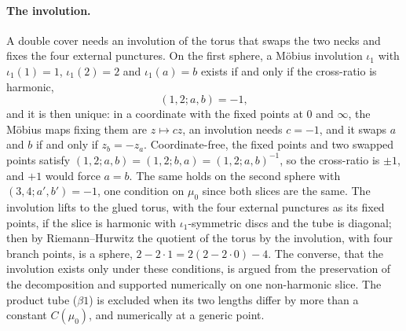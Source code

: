 \paragraph{The involution.}
A double cover needs an involution of the torus that swaps the two necks and fixes the four external punctures.
On the first sphere, a Möbius involution $\iota_1$ with $\iota_1(1) = 1$, $\iota_1(2) = 2$ and $\iota_1(a) = b$ exists if and only if the cross-ratio is harmonic,
\begin{equation}
  \label{eq:ch9:harmonic}
  (1, 2; a, b)
    = - 1,
\end{equation}
and it is then unique: in a coordinate with the fixed points at $0$ and $\infty$, the Möbius maps fixing them are $z \mapsto c z$, an involution needs $c = - 1$, and it swaps $a$ and $b$ if and only if $z_b = - z_a$.
Coordinate-free, the fixed points and two swapped points satisfy $(1, 2; a, b) = (1, 2; b, a) = (1, 2; a, b)^{-1}$, so the cross-ratio is $\pm 1$, and $+ 1$ would force $a = b$.
The same holds on the second sphere with $(3, 4; a', b') = - 1$, one condition on $\mu_0$ since both slices are the same.
The involution lifts to the glued torus, with the four external punctures as its fixed points, if the slice is harmonic with $\iota_1$-symmetric discs and the tube is diagonal; then by Riemann--Hurwitz the quotient of the torus by the involution, with four branch points, is a sphere, $2 - 2 \cdot 1 = 2 (2 - 2 \cdot 0) - 4$.
The converse, that the involution exists only under these conditions, is argued from the preservation of the decomposition and supported numerically on one non-harmonic slice.
The product tube ($\beta 1$) is excluded when its two lengths differ by more than a constant $C(\mu_0)$, and numerically at a generic point.

